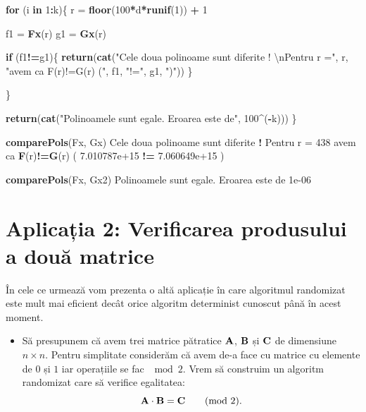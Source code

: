 \documentclass[]{article}
\newenvironment{Shaded}{\begin{snugshade}}{\end{snugshade}}
\newcommand{\KeywordTok}[1]{\textcolor[rgb]{0.13,0.29,0.53}{\textbf{#1}}}
\newcommand{\DecValTok}[1]{\textcolor[rgb]{0.00,0.00,0.81}{#1}}
\newcommand{\FloatTok}[1]{\textcolor[rgb]{0.00,0.00,0.81}{#1}}
\newcommand{\CharTok}[1]{\textcolor[rgb]{0.31,0.60,0.02}{#1}}
\newcommand{\StringTok}[1]{\textcolor[rgb]{0.31,0.60,0.02}{#1}}
\newcommand{\ControlFlowTok}[1]{\textcolor[rgb]{0.13,0.29,0.53}{\textbf{#1}}}
\newcommand{\OperatorTok}[1]{\textcolor[rgb]{0.81,0.36,0.00}{\textbf{#1}}}
\newcommand{\NormalTok}[1]{#1}
\newenvironment{frshaded*}{%
  \def\FrameCommand{\fboxrule=\FrameRule\fboxsep=\FrameSep \fcolorbox{framecolor}{shadecolor1}}%
  \MakeFramed {\advance\hsize-\width \FrameRestore}}%
{\endMakeFramed}
\newenvironment{rmdblock}[1]
  {\begin{frshaded*}
  \begin{itemize}
  \renewcommand{\labelitemi}{
    \raisebox{-.7\height}[0pt][0pt]{
      {\setkeys{Gin}{width=2em,keepaspectratio}\texttt{[image: images/icons/\#1]}}
    }
  }
  \item
  }
  {
  \end{itemize}
  \end{frshaded*}
  }
\newenvironment{rmdexercise}
  {\begin{rmdblock}{exercise}}
  {\end{rmdblock}}
\begin{document}
\begin{Shaded}
\begin{Highlighting}[]
  \ControlFlowTok{for}\NormalTok{ (i }\ControlFlowTok{in} \DecValTok{1}\OperatorTok{:}\NormalTok{k)\{}
\NormalTok{    r =}\StringTok{ }\KeywordTok{floor}\NormalTok{(}\DecValTok{100}\OperatorTok{*}\NormalTok{d}\OperatorTok{*}\KeywordTok{runif}\NormalTok{(}\DecValTok{1}\NormalTok{)) }\OperatorTok{+}\StringTok{ }\DecValTok{1}
    
\NormalTok{    f1 =}\StringTok{ }\KeywordTok{Fx}\NormalTok{(r)}
\NormalTok{    g1 =}\StringTok{ }\KeywordTok{Gx}\NormalTok{(r)}
    
    \ControlFlowTok{if}\NormalTok{ (f1}\OperatorTok{!=}\NormalTok{g1)\{}
      \KeywordTok{return}\NormalTok{(}\KeywordTok{cat}\NormalTok{(}\StringTok{"Cele doua polinoame sunt diferite ! }\CharTok{\textbackslash{}n}\StringTok{Pentru r ="}\NormalTok{, }
\NormalTok{                         r, }\StringTok{"avem ca F(r)!=G(r) ("}\NormalTok{, f1, }\StringTok{"!="}\NormalTok{, g1, }\StringTok{")"}\NormalTok{))}
\NormalTok{    \}}
    
\NormalTok{  \}}
  
  \KeywordTok{return}\NormalTok{(}\KeywordTok{cat}\NormalTok{(}\StringTok{"Polinoamele sunt egale. Eroarea este de"}\NormalTok{, }\DecValTok{100}\OperatorTok{^}\NormalTok{(}\OperatorTok{-}\NormalTok{k)))}
\NormalTok{\}}

\KeywordTok{comparePols}\NormalTok{(Fx, Gx)}
\NormalTok{Cele doua polinoame sunt diferite }\OperatorTok{!}\StringTok{ }
\NormalTok{Pentru r =}\StringTok{ }\DecValTok{438}\NormalTok{ avem ca }\KeywordTok{F}\NormalTok{(r)}\OperatorTok{!=}\KeywordTok{G}\NormalTok{(r) ( }\FloatTok{7.010787e+15} \OperatorTok{!=}\StringTok{ }\FloatTok{7.060649e+15}\NormalTok{ )}

\KeywordTok{comparePols}\NormalTok{(Fx, Gx2)}
\NormalTok{Polinoamele sunt egale. Eroarea este de }\FloatTok{1e-06}
\end{Highlighting}
\end{Shaded}

\section{Aplicația 2: Verificarea produsului a două
matrice}\label{aplicatia-2-verificarea-produsului-a-doua-matrice}

În cele ce urmează vom prezenta o altă aplicație în care algoritmul
randomizat este mult mai eficient decât orice algoritm determinist
cunoscut până în acest moment.

\begin{rmdexercise}
Să presupunem că avem trei matrice pătratice \(\bf{A}\), \(\bf{B}\) și
\(\bf{C}\) de dimensiune \(n \times n\). Pentru simplitate considerăm că
avem de-a face cu matrice cu elemente de \(0\) și \(1\) iar operațiile
se fac \(\mod2\). Vrem să construim un algoritm randomizat care să
verifice egalitatea: \[
  \bf{A}\cdot\bf{B}=\bf{C} \qquad (\text{mod 2}).
\]
\end{rmdexercise}
\end{document}
